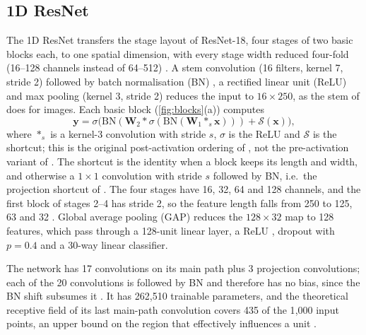 \documentclass[journal,onecolumn]{IEEEtran}
\begin{document}
\subsection{1D ResNet}
\label{sec:models-resnet}
The 1D ResNet transfers the stage layout of ResNet-18, four stages of two
basic blocks each, to one spatial dimension, with every stage width reduced
four-fold (16--128 channels instead of 64--512) \cite{he2016deep}. A stem
convolution (16 filters, kernel 7, stride 2) followed by batch
normalisation (BN) \cite{ioffe2015batch}, a rectified linear unit (ReLU)
\cite{nair2010rectified} and max pooling (kernel 3, stride 2) reduces the
input to $16{\times}250$, as the stem of \cite{he2016deep} does for images.
Each basic block (\cref{fig:blocks}(a)) computes
\begin{equation}
  \mathbf{y} = \sigma\!\bigl(\mathrm{BN}(\mathbf{W}_2 * \sigma(\mathrm{BN}(\mathbf{W}_1 *_s \mathbf{x})))
               + \mathcal{S}(\mathbf{x})\bigr),
  \label{eq:block}
\end{equation}
where $*_s$ is a kernel-3 convolution with stride $s$, $\sigma$ is the ReLU
and $\mathcal{S}$ is the shortcut; this is the original post-activation
ordering of \cite{he2016deep}, not the pre-activation variant of
\cite{he2016identity}. The shortcut is the identity when a block keeps its
length and width, and otherwise a $1{\times}1$ convolution with stride $s$
followed by BN, i.e.\ the projection shortcut of \cite{he2016deep}. The
four stages have 16, 32, 64 and 128 channels, and the first block of
stages 2--4 has stride 2, so the feature length falls from 250 to 125, 63
and 32 \cite{he2016deep}. Global average pooling (GAP) \cite{lin2014network}
reduces the $128{\times}32$ map to 128 features, which pass through a
128-unit linear layer, a ReLU \cite{nair2010rectified}, dropout with
$p=0.4$ \cite{srivastava2014dropout} and a 30-way linear classifier.

The network has 17 convolutions on its main path plus 3 projection
convolutions; each of the 20 convolutions is followed by BN and therefore
has no bias, since the BN shift subsumes it \cite{ioffe2015batch}. It has
262{,}510 trainable parameters, and the theoretical receptive field of its
last main-path convolution covers 435 of the 1{,}000 input points, an upper
bound on the region that effectively influences a unit
\cite{luo2016understanding}.
\end{document}
